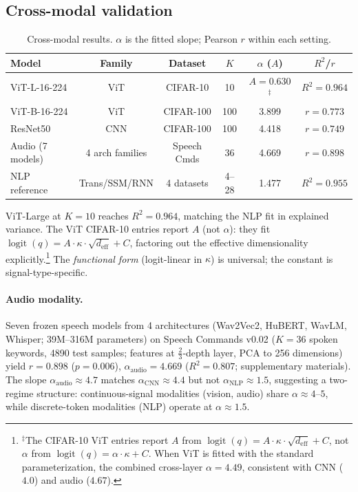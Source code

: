 \documentclass{article}
\DeclareMathOperator{\logit}{logit}
\begin{document}
\subsection{Cross-modal validation}

\begin{table}[t]
\centering
\caption{Cross-modal results. $\alpha$ is the fitted slope; Pearson $r$ within each setting.}
\label{tab:vit}
\small
\begin{tabular}{lccccc}
\toprule
Model & Family & Dataset & $K$ & $\alpha$ ($A$) & $R^2$/$r$ \\
\midrule
ViT-L-16-224 & ViT & CIFAR-10 & 10 & $A{=}0.630$$^\ddagger$ & $R^2{=}0.964$ \\
ViT-B-16-224 & ViT & CIFAR-100 & 100 & 3.899 & $r{=}0.773$ \\
ResNet50 & CNN & CIFAR-100 & 100 & 4.418 & $r{=}0.749$ \\
Audio (7 models) & 4 arch families & Speech Cmds & 36 & 4.669 & $r{=}0.898$ \\
\midrule
NLP reference & Trans/SSM/RNN & 4 datasets & 4--28 & 1.477 & $R^2{=}0.955$ \\
\bottomrule
\end{tabular}
\end{table}

ViT-Large at $K=10$ reaches $R^2=0.964$, matching the NLP fit in explained variance. The ViT CIFAR-10 entries report $A$ (not $\alpha$): they fit $\logit(q)=A\cdot\kappa\cdot\sqrt{d_\mathrm{eff}}+C$, factoring out the effective dimensionality explicitly.\footnote{$^\ddagger$The CIFAR-10 ViT entries report $A$ from $\logit(q)=A\cdot\kappa\cdot\sqrt{d_\mathrm{eff}}+C$, not $\alpha$ from $\logit(q)=\alpha\cdot\kappa+C$. When ViT is fitted with the standard parameterization, the combined cross-layer $\alpha{=}4.49$, consistent with CNN ($4.0$) and audio ($4.67$).} The \emph{functional form} (logit-linear in $\kappa$) is universal; the constant is signal-type-specific.

\paragraph{Audio modality.}
Seven frozen speech models from 4 architectures (Wav2Vec2, HuBERT, WavLM, Whisper; 39M--316M parameters) on Speech Commands v0.02 ($K=36$ spoken keywords, 4890 test samples; features at $\frac{2}{3}$-depth layer, PCA to 256 dimensions) yield $r=0.898$ ($p=0.006$), $\alpha_\mathrm{audio}=4.669$ ($R^2=0.807$; supplementary materials).
The slope $\alpha_\mathrm{audio}\approx4.7$ matches $\alpha_\mathrm{CNN}\approx4.4$ but not $\alpha_\mathrm{NLP}\approx1.5$, suggesting a two-regime structure: continuous-signal modalities (vision, audio) share $\alpha\approx4$--$5$, while discrete-token modalities (NLP) operate at $\alpha\approx1.5$.
\end{document}
